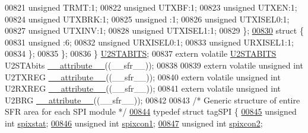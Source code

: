 \begin{DoxyCode}
00821       \textcolor{keywordtype}{unsigned} TRMT:1;
00822       \textcolor{keywordtype}{unsigned} UTXBF:1;
00823       \textcolor{keywordtype}{unsigned} UTXEN:1;
00824       \textcolor{keywordtype}{unsigned} UTXBRK:1;
00825       \textcolor{keywordtype}{unsigned} :1;
00826       \textcolor{keywordtype}{unsigned} UTXISEL0:1;
00827       \textcolor{keywordtype}{unsigned} UTXINV:1;
00828       \textcolor{keywordtype}{unsigned} UTXISEL1:1;
00829     \};
\hypertarget{a00009_source_l00830}{}\hyperlink{a00009}{00830}     \textcolor{keyword}{struct }\{
00831       \textcolor{keywordtype}{unsigned} :6;
00832       \textcolor{keywordtype}{unsigned} URXISEL0:1;
00833       \textcolor{keywordtype}{unsigned} URXISEL1:1;
00834     \};
00835   \};
00836 \} \hyperlink{a00008_d2/dc7/a00838}{U2STABITS};
00837 \textcolor{keyword}{extern} \textcolor{keyword}{volatile} \hyperlink{a00008_d2/dc7/a00838}{U2STABITS} U2STAbits \hyperlink{a00009_a493c46f03454991ccc5aa7a6e1dfb2a7}{\_\_attribute\_\_}((\_\_sfr\_\_));
00838 
00839 \textcolor{keyword}{extern} \textcolor{keyword}{volatile} \textcolor{keywordtype}{unsigned} \textcolor{keywordtype}{int}  U2TXREG \hyperlink{a00009_a493c46f03454991ccc5aa7a6e1dfb2a7}{\_\_attribute\_\_}((\_\_sfr\_\_));
00840 \textcolor{keyword}{extern} \textcolor{keyword}{volatile} \textcolor{keywordtype}{unsigned} \textcolor{keywordtype}{int}  U2RXREG \hyperlink{a00009_a493c46f03454991ccc5aa7a6e1dfb2a7}{\_\_attribute\_\_}((\_\_sfr\_\_));
00841 \textcolor{keyword}{extern} \textcolor{keyword}{volatile} \textcolor{keywordtype}{unsigned} \textcolor{keywordtype}{int}  U2BRG \hyperlink{a00009_a493c46f03454991ccc5aa7a6e1dfb2a7}{\_\_attribute\_\_}((\_\_sfr\_\_));
00842 
00843 \textcolor{comment}{/* Generic structure of entire SFR area for each SPI module */}
\hypertarget{a00009_source_l00844}{}\hyperlink{a00008}{00844} \textcolor{keyword}{typedef} \textcolor{keyword}{struct }tagSPI \{
\hypertarget{a00009_source_l00845}{}\hyperlink{a00008_abef89a15a5da0a184b4f3c8605131827}{00845}         \textcolor{keywordtype}{unsigned} \textcolor{keywordtype}{int} \hyperlink{a00008_abef89a15a5da0a184b4f3c8605131827}{spixstat};
\hypertarget{a00009_source_l00846}{}\hyperlink{a00008_a91ad3051fa8851d3a39f5178b40b6ca5}{00846}         \textcolor{keywordtype}{unsigned} \textcolor{keywordtype}{int} \hyperlink{a00008_a91ad3051fa8851d3a39f5178b40b6ca5}{spixcon1};
\hypertarget{a00009_source_l00847}{}\hyperlink{a00008_a2e1664d721667038d3117ae858fc85c4}{00847}         \textcolor{keywordtype}{unsigned} \textcolor{keywordtype}{int} \hyperlink{a00008_a2e1664d721667038d3117ae858fc85c4}{spixcon2};

\end{DoxyCode}
